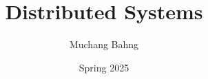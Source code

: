 \documentclass{article}
\begin{document}
\title{Distributed Systems}
\author{Muchang Bahng}
\date{Spring 2025}

\maketitle
\tableofcontents
\pagebreak
\end{document}
